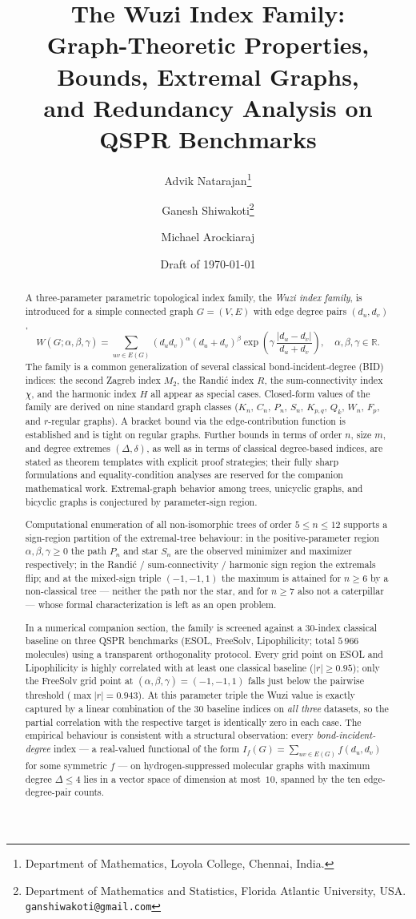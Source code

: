 \documentclass[11pt,a4paper]{article}
\title{\bfseries The Wuzi Index Family:\\ Graph-Theoretic Properties, Bounds, Extremal Graphs,\\ and Redundancy Analysis on QSPR Benchmarks}
\author{
  Advik Natarajan\thanks{Department of Mathematics, Loyola College, Chennai, India.} \and
  Ganesh Shiwakoti\thanks{Department of Mathematics and Statistics, Florida Atlantic University, USA. \texttt{ganshiwakoti@gmail.com}} \and
  Michael Arockiaraj\footnotemark[1]
}
\date{Draft of \today}
\theoremstyle{definition}
\newcommand{\Wuzi}{W(G;\alpha,\beta,\gamma)}
\begin{document}
\maketitle

\begin{abstract}
A three-parameter parametric topological index family, the
\emph{Wuzi index family}, is introduced for a simple connected
graph $G=(V,E)$ with edge degree pairs $(d_u,d_v)$,
\[
\Wuzi
=\sum_{uv\in E(G)}
(d_u d_v)^{\alpha}(d_u+d_v)^{\beta}
\exp\!\left(\gamma\,\frac{|d_u-d_v|}{d_u+d_v}\right),
\quad
\alpha,\beta,\gamma\in\mathbb{R}.
\]
The family is a common generalization of several classical
bond-incident-degree (BID) indices: the second Zagreb index $M_{2}$,
the Randi\'c index $R$, the sum-connectivity index $\chi$, and the
harmonic index $H$ all appear as special cases. Closed-form values
of the family are derived on nine standard graph classes
($K_n,\,C_n,\,P_n,\,S_n,\,K_{p,q},\,Q_k,\,W_n,\,F_p$, and
$r$-regular graphs). A bracket bound via the edge-contribution
function is established and is tight on regular graphs. Further
bounds in terms of order $n$, size $m$, and degree extremes
$(\Delta,\delta)$, as well as in terms of classical degree-based
indices, are stated as theorem templates with explicit proof
strategies; their fully sharp formulations and equality-condition
analyses are reserved for the companion mathematical work.
Extremal-graph behavior among trees, unicyclic graphs, and
bicyclic graphs is conjectured by parameter-sign region.

Computational enumeration of all non-isomorphic trees of order
$5 \le n \le 12$ supports a sign-region partition of the
extremal-tree behaviour: in the positive-parameter region
$\alpha, \beta, \gamma \ge 0$ the path $P_n$ and star $S_n$ are
the observed minimizer and maximizer respectively; in the
Randi\'c / sum-connectivity / harmonic sign region the extremals
flip; and at the mixed-sign triple $(-1, -1, 1)$ the maximum is
attained for $n \ge 6$ by a non-classical tree --- neither the
path nor the star, and for $n \ge 7$ also not a caterpillar ---
whose formal characterization is left as an open problem.

In a numerical companion section, the family is screened against a
30-index classical baseline on three QSPR benchmarks (ESOL,
FreeSolv, Lipophilicity; total $5\,966$ molecules) using a
transparent orthogonality protocol. Every grid point on ESOL and
Lipophilicity is highly correlated with at least one classical
baseline ($|r|\ge 0.95$); only the FreeSolv grid point at
$(\alpha,\beta,\gamma)=(-1,-1,1)$ falls just below the pairwise
threshold ($\max|r|=0.943$). At this parameter triple the Wuzi
value is exactly captured by a linear combination of the $30$
baseline indices on \emph{all three} datasets, so the partial
correlation with the respective target is identically zero in each
case. The empirical behaviour is consistent with a structural
observation: every \emph{bond-incident-degree} index --- a
real-valued functional of the form
$I_f(G) = \sum_{uv \in E(G)} f(d_u, d_v)$ for some symmetric
$f$ --- on hydrogen-suppressed molecular graphs with maximum
degree $\Delta\le 4$ lies in a vector space of dimension at
most~$10$, spanned by the ten edge-degree-pair counts.


\end{abstract}
\end{document}
